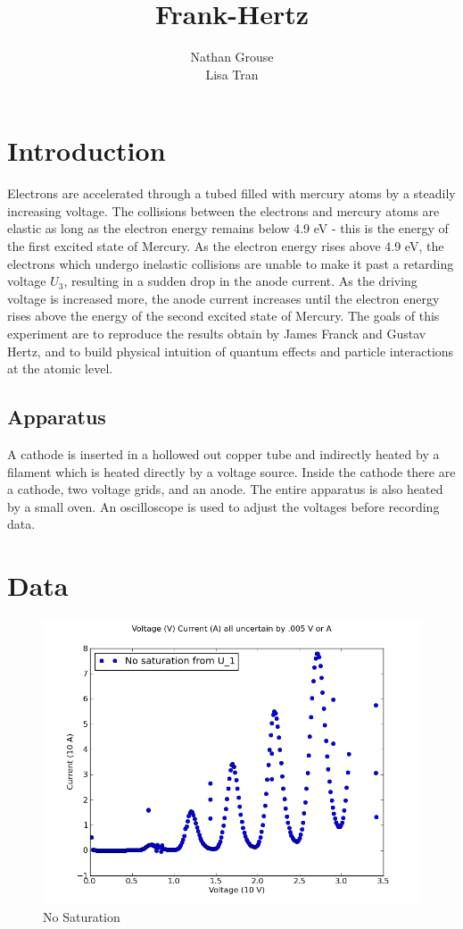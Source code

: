 \documentclass[12pt]{article}
\title{Frank-Hertz}
\author{Nathan Grouse\\Lisa Tran}
\begin{document}
\maketitle

\section{Introduction}
\indent \indent Electrons are accelerated through a tubed filled with mercury atoms by a steadily increasing voltage. The collisions between the electrons and mercury atoms are elastic as long as the electron energy remains below 4.9 eV - this is the energy of the first excited state of Mercury. As the electron energy rises above 4.9 eV, the electrons which undergo inelastic collisions are unable to make it past a retarding voltage $U_3$,
resulting in a sudden drop in the anode current. As the driving voltage is increased more, the anode current increases until the electron energy rises above the energy of the second excited state of Mercury. The goals of this experiment are to reproduce the results obtain by James Franck and Gustav Hertz, and to build physical intuition of quantum effects and particle interactions at the atomic level.

\subsection{Apparatus}
\indent \indent A cathode is inserted in a hollowed out copper tube and indirectly heated by a filament which is heated directly by a voltage source. Inside the cathode there are a cathode, two voltage grids, and an anode. The entire apparatus is also heated by a small oven. An oscilloscope is used to adjust the voltages before recording data.

\section{Data}
\begin{figure}[H]
\centering
\hspace{-0.0in}\includegraphics[scale=0.60]{Plot1.png}
\caption{No Saturation \label{fig:setup}}
\end{figure}
\end{document}
